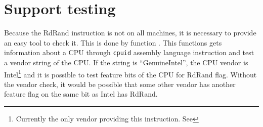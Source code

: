 \section{Support testing}
Because the RdRand instruction is not on all machines, it is necessary to provide an easy tool to check it. This is done by function . This functions gets information about a CPU through {\tt cpuid} assembly language instruction and test a vendor string of the CPU. If the string is ``GenuineIntel'', the CPU vendor is Intel\footnote{Currently the only vendor providing this instruction. See } and it is possible to test feature bits of the CPU for RdRand flag. Without the vendor check, it would be possible that some other vendor has another feature flag on the same bit as Intel has RdRand.



